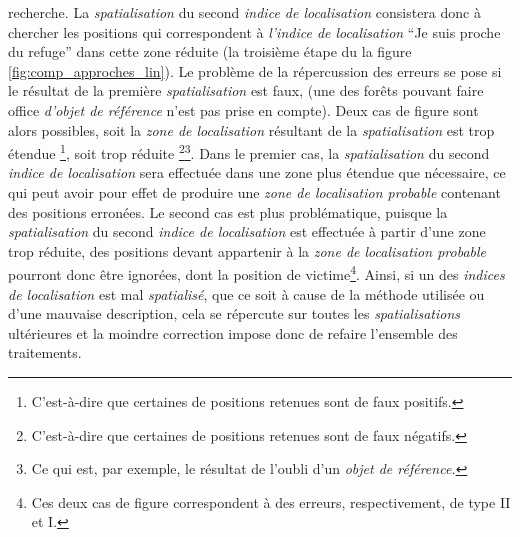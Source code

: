 recherche. La \emph{spatialisation} du second \emph{indice de
  localisation} consistera donc à chercher les positions qui
correspondent à \emph{l'indice de localisation} \enquote{Je suis
  proche du refuge} dans cette zone réduite (\ie la troisième étape du
la figure \ref{fig:comp_approches_lin}). Le problème de la
répercussion des erreurs se pose si le résultat de la première
\emph{spatialisation} est faux, (\eg une des forêts pouvant faire
office \emph{d'objet de référence} n'est pas prise en compte). Deux
cas de figure sont alors possibles, soit la \emph{zone de
  localisation} résultant de la \emph{spatialisation} est trop étendue
\footnote{C'est-à-dire que certaines de positions retenues sont de
  faux positifs.}, soit trop réduite \footnote{C'est-à-dire que
  certaines de positions retenues sont de faux
  négatifs.}\multiplefootnoteseparator \footnote{Ce qui est, par
  exemple, le résultat de l'oubli d'un \emph{objet de référence.}}.
Dans le premier cas, la \emph{spatialisation} du second \emph{indice
  de localisation} sera effectuée dans une zone plus étendue que
nécessaire, ce qui peut avoir pour effet de produire une \emph{zone de
  localisation probable} contenant des positions erronées. Le second
cas est plus problématique, puisque la \emph{spatialisation} du second
\emph{indice de localisation} est effectuée à partir d'une zone trop
réduite, des positions devant appartenir à la \emph{zone de
  localisation probable} pourront donc être ignorées, dont la position
de victime\footnote{Ces deux cas de figure correspondent à des
  erreurs, respectivement, de type II et I.}. Ainsi, si un des
\emph{indices de localisation} est mal \emph{spatialisé}, que ce soit
à cause de la méthode utilisée ou d'une mauvaise description, cela se
répercute sur toutes les \emph{spatialisations} ultérieures et la
moindre correction impose donc de refaire l'ensemble des traitements.

